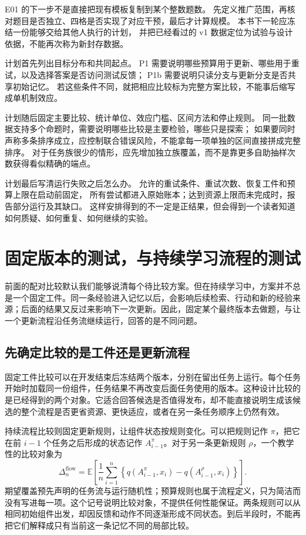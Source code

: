 E01 的下一步不是直接把现有模板复制到某个整数题数。
先定义推广范围，再核对题目是否独立、四格是否实现了对应干预，最后才计算规模。
本书下一轮应冻结一份能够交给其他人执行的计划，
并把已经看过的 v1 数据定位为试验与设计依据，不能再次称为新封存数据。

计划首先列出目标分布和共同起点。
P1 需要说明哪些预算用于更新、哪些用于重试，以及选择答案是否访问测试反馈；
P1b 需要说明只读分支与更新分支是否共享初始记忆。
若这些条件不同，就把相应比较标为完整方案比较，不能事后缩写成单机制效应。

计划随后固定主要比较、统计单位、效应门槛、区间方法和停止规则。
同一批数据支持多个命题时，需要说明哪些比较是主要检验，哪些只是探索；
如果要同时声称多条排序成立，应控制联合错误风险，不能拿每一项单独的区间直接拼成完整排序。
对于任务族很少的情形，应先增加独立族覆盖，而不是靠更多自助抽样次数获得看似精确的端点。

计划最后写清运行失败之后怎么办。
允许的重试条件、重试次数、恢复工件和预算上限在启动前固定，
所有尝试都进入原始账本；达到资源上限而未完成时，报告部分运行及其缺口。
这样安排得到的不一定是正结果，但会得到一个读者知道如何质疑、如何重复、如何继续的实验。


\section{固定版本的测试，与持续学习流程的测试}
\label{sec:ch03-streams}

前面的配对比较默认我们能够说清每个待比较方案。但在持续学习中，方案并不总是一个固定工件。同一条经验进入记忆以后，会影响后续检索、行动和新的经验来源；后面的结果又反过来影响下一次更新。因此，固定某个最终版本去做题，与让一个更新流程沿任务流继续运行，回答的是不同问题。

\subsection{先确定比较的是工件还是更新流程}

固定工件比较可以在开发结束后冻结两个版本，分别在留出任务上运行。每个任务开始时加载同一份组件，任务结果不再改变后面任务使用的版本。这种设计比较的是已经得到的两个对象。它适合回答候选是否值得发布，却不能直接说明生成该候选的整个流程是否更省资源、更快适应，或者在另一条任务顺序上仍然有效。

持续流程比较则固定更新规则，让组件状态按规则变化。可以把规则记作 $\pi$，把它在前 $i-1$ 个任务之后形成的状态记作 $A^{\pi}_{i-1}$。对于另一条更新规则 $\rho$，一个教学性的比较对象为
\begin{equation}
 \Delta_n^{\mathrm{flow}}=
 \mathbb E\!\left[\frac{1}{n}\sum_{i=1}^{n}
 \left\{q(A^{\pi}_{i-1},x_i)-q(A^{\rho}_{i-1},x_i)\right\}\right].
 \label{eq:ch03-flow-estimand}
\end{equation}
期望覆盖预先声明的任务流与运行随机性；预算规则也属于流程定义，只为简洁而没有写进每一项。这个记号说明比较对象，不提供任何性能保证。两条规则可以从相同初始组件出发，却因反馈和动作不同逐渐形成不同状态。到后半段时，不能再把它们解释成只有当前这一条记忆不同的局部比较。

